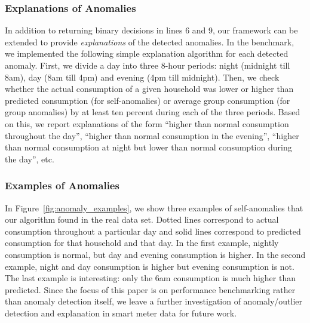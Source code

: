 \documentclass[prodmode,acmtods]{acmsmall}
\begin{document}

\subsubsection{Explanations of Anomalies}

In addition to returning binary decisions in lines 6 and 9, our framework can be extended to provide \emph{explanations} of the detected anomalies.  In the benchmark, we implemented the following simple explanation algorithm for each detected anomaly.  First, we divide a day into three 8-hour periods: night (midnight till 8am), day (8am till 4pm) and evening (4pm till midnight).   Then, we check whether the actual consumption of a given household was lower or higher than predicted consumption (for self-anomalies) or average group consumption (for group anomalies) by at least ten percent during each of the three periods.  Based on this, we report explanations of the form ``higher than normal consumption throughout the day'', ``higher than normal consumption in the evening'', ``higher than normal consumption at night but lower than normal consumption during the day'', etc.  

\subsubsection{Examples of Anomalies}

In Figure~\ref{fig:anomaly_examples}, we show three examples of self-anomalies that our algorithm found in the real data set.  Dotted lines correspond to actual consumption throughout a particular day and solid lines correspond to predicted consumption for that household and that day.  In the first example, nightly consumption is normal, but day and evening consumption is higher.  In the second example, night and day consumption is higher but evening consumption is not.  The last example is interesting: only the 6am consumption is much higher than predicted.  Since the focus of this paper is on performance benchmarking rather than anomaly detection itself, we leave a further investigation of anomaly/outlier detection and explanation in smart meter data for future work.
\end{document}
